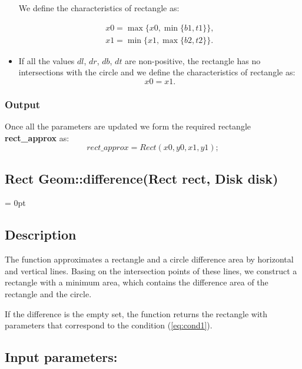 \documentclass{report}
\begin{document}
\begin{itemize}
			We define the characteristics of rectangle as:
		
			\begin{equation}
				\begin{gathered}
					x0 = \max\{x0, \min\{b1, t1\}\},\\
					x1 = \min\{x1, \max\{b2, t2\}\}.
				\end{gathered}
			\end{equation}
		
			\item If all the values $dl$, $dr$, $db$, $dt$  are non-positive,  the rectangle has no intersections with the circle and we define the characteristics of rectangle as: 
			\begin{equation}
				x0 = x1.
				\label{eq:empty}
			\end{equation}
	
	\end{itemize}	
	\subsubsection*{Output}

Once all the parameters are updated we form the required rectangle {\bfseries rect\_approx} as:
\begin{equation}
	rect\_approx = Rect(x0, y0, x1, y1);
	\label{rect}
\end{equation}
\newpage
	
\begin{center} 
	\section*{Rect Geom::difference(Rect rect, Disk disk)}
\end{center}
\parindent = 0pt
\subsection*{Description}

The function approximates a rectangle and a circle difference area by horizontal and vertical lines. Basing on the intersection points of these lines, we construct a rectangle with a minimum area, which contains the difference area of the rectangle and the circle.

If the difference is the empty set, the function returns the rectangle with parameters that correspond to the condition (\ref{eq:cond1}).

\subsection*{Input parameters:}
\end{document}

